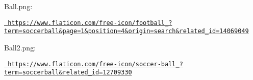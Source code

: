 Ball.\+png\+:


\begin{DoxyItemize}
\item \href{https://www.flaticon.com/free-icon/football_14069049?term=soccerball&page=1&position=4&origin=search&related_id=14069049}{\texttt{ https\+://www.\+flaticon.\+com/free-\/icon/football\+\_?term=soccerball\&page=1\&position=4\&origin=search\&related\+\_\+id=14069049}}
\end{DoxyItemize}

Ball2.\+png\+:


\begin{DoxyItemize}
\item \href{https://www.flaticon.com/free-icon/soccer-ball_12709330?term=soccerball&related_id=12709330}{\texttt{ https\+://www.\+flaticon.\+com/free-\/icon/soccer-\/ball\+\_?term=soccerball\&related\+\_\+id=12709330}} 
\end{DoxyItemize}